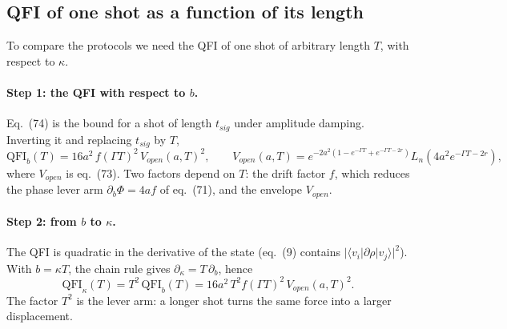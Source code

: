 \subsection{QFI of one shot as a function of its length}
\label{sec:rep-FT}

To compare the protocols we need the QFI of one shot of arbitrary length $T$, with respect to $\kappa$.

\paragraph{Step 1: the QFI with respect to $b$.} Eq.~(74) is the bound for a shot of length $t_{sig}$ under amplitude damping. Inverting it and replacing $t_{sig}$ by $T$,
\begin{equation}
\label{eq:R-QFIb}
    \mathrm{QFI}_b(T) = 16a^2\,f(\Gamma T)^2\,V_{open}(a, T)^2,
    \qquad
    V_{open}(a, T) = e^{-2a^2(1 - e^{-\Gamma T} + e^{-\Gamma T - 2r})}L_n\!\left(4a^2e^{-\Gamma T - 2r}\right),
\end{equation}
where $V_{open}$ is eq.~(73). Two factors depend on $T$: the drift factor $f$, which reduces the phase lever arm $\partial_b\Phi = 4a f$ of eq.~(71), and the envelope $V_{open}$.

\paragraph{Step 2: from $b$ to $\kappa$.} The QFI is quadratic in the derivative of the state (eq.~(9) contains $\vert\langle v_i\vert\partial\rho\vert v_j\rangle\vert^2$). With $b = \kappa T$, the chain rule gives $\partial_\kappa = T\,\partial_b$, hence
\begin{equation}
\label{eq:R-chain}
    \mathrm{QFI}_\kappa(T) = T^2\,\mathrm{QFI}_b(T) = 16a^2\,T^2 f(\Gamma T)^2\,V_{open}(a, T)^2 .
\end{equation}
The factor $T^2$ is the lever arm: a longer shot turns the same force into a larger displacement.

